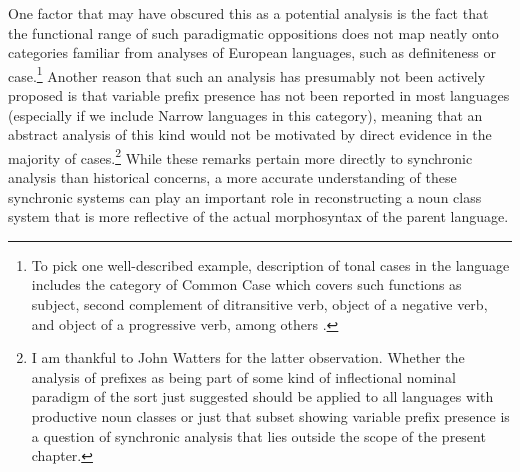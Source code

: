 \documentclass[output=paper ,collection	  ,collectionchapter ,biblatexbackend=biber   ]{langscibook}
\begin{document}
\newpage %
One factor that may have obscured this as a potential analysis is the fact that
the functional range of such paradigmatic oppositions does not map neatly onto
categories familiar from analyses of European languages, such as definiteness or
case.{\footnote{To pick one well-described example, 
description of tonal cases in the  language  includes the category
of Common Case which covers such functions as subject, second complement of
ditransitive verb, object of a negative verb, and object of a progressive verb,
among others \cite[433--437]{Schadeberg1986}.}} Another reason that such an
analysis has presumably not been actively proposed is that variable prefix
presence has not been reported in most  languages (especially
if we include Narrow  languages in this category), meaning that an abstract
analysis of this kind would not be motivated by direct evidence in the majority
of cases.{\footnote{I am thankful to John Watters for the latter observation.
Whether the analysis of prefixes as being part of some kind of inflectional
nominal paradigm of the sort just suggested should be applied to all 
languages with productive noun classes or just that subset showing
variable prefix presence is a question of synchronic analysis that lies outside
the scope of the present chapter.}} While these remarks pertain more directly to
synchronic analysis than historical concerns, a more accurate understanding of
these synchronic systems can play an important role in reconstructing a
 noun class system that is more reflective of the actual
morphosyntax of the  parent language.
\end{document}
